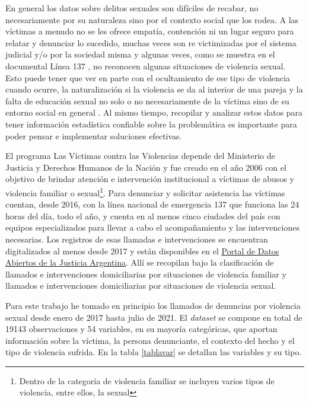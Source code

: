 \documentclass[10 pt]{article}
\begin{document}
En general los datos sobre delitos sexuales son difíciles de recabar, no necesariamente por su naturaleza sino por el contexto social que los rodea. A las víctimas a menudo no se les ofrece empatía, contención ni un lugar seguro para relatar y denunciar lo sucedido, muchas veces son re victimizadas por el sistema judicial y/o por la sociedad misma y algunas veces, como se muestra en el documental Línea 137 \citep{vasallo2020linea137}, no reconocen algunas situaciones de violencia sexual. Esto puede tener que ver en parte con el ocultamiento de ese tipo de violencia cuando ocurre, la naturalización si la violencia se da al interior de una pareja y la falta de educación sexual no solo o no necesariamente de la víctima sino de su entorno social en general \citep{contreras2016violencia}. Al mismo tiempo, recopilar y analizar estos datos para tener información estadística confiable sobre la problemática es importante para poder pensar e implementar soluciones efectivas.

El programa Las Víctimas contra las Violencias depende del Ministerio de Justicia y Derechos Humanos de la Nación y fue creado en el año 2006 con el objetivo de brindar atención e intervención institucional a víctimas de abusos y violencia familiar o sexual\footnote{Dentro de la categoría de violencia familiar se incluyen varios tipos de violencia, entre ellos, la sexual}. Para denunciar  y solicitar asistencia las víctimas cuentan, desde 2016, con la línea nacional de emergencia 137 que funciona las 24 horas del día, todo el año, y cuenta en al menos cinco ciudades del país con equipos especializados para llevar a cabo el acompañamiento y las intervenciones necesarias. Los registros de esas llamadas e intervenciones se encuentran digitalizados al menos desde 2017 y están disponibles en el \href{http://datos.jus.gob.ar/}{Portal de Datos Abiertos de la Justicia Argentina}. Allí se recopilan bajo la clasificación de llamados e intervenciones domiciliarias por situaciones de violencia familiar y llamados e intervenciones domiciliarias por situaciones de violencia sexual. 

Para este trabajo he tomado en principio los llamados de denuncias por violencia sexual desde enero de 2017 hasta julio de 2021. El \textit{dataset} se compone en total de 19143 observaciones y 54 variables, en su mayoría categóricas, que aportan información sobre la víctima, la persona denunciante, el contexto del hecho y el tipo de violencia sufrida. En la tabla \ref{tablavar} se detallan las variables y su tipo.
\end{document}
